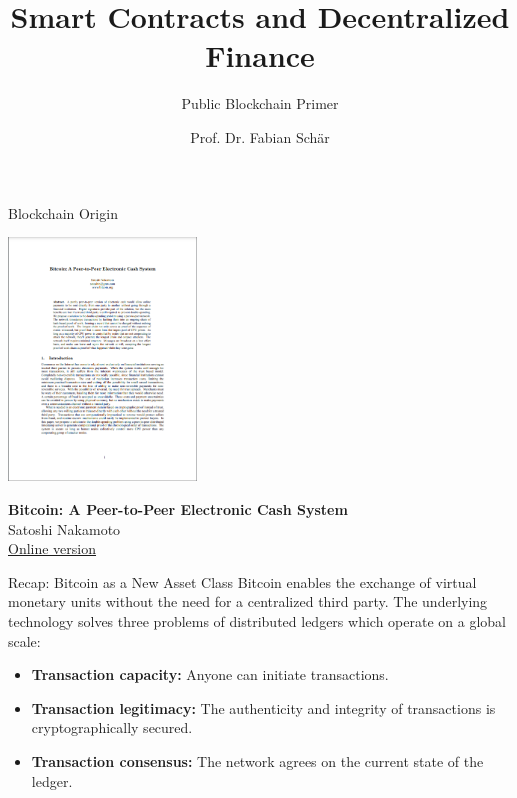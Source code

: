 \documentclass[]{beamer}
\title{Smart Contracts and Decentralized Finance}
\subtitle{Public Blockchain Primer}
\author{Prof. Dr. Fabian Schär}
\institute{University of Basel}
\begin{document}
\thispagestyle{empty}
\begin{frame}[noframenumbering]
	\titlepage
\end{frame}

\begin{frame}{Blockchain Origin}

\centering
\includegraphics[width = 5cm, frame]{../assets/images/nakamoto_cover}
		
\textbf{Bitcoin: A Peer-to-Peer Electronic Cash System} \\ 
Satoshi Nakamoto \\
\href{https://bitcoin.org/bitcoin.pdf}{\link Online version}

\end{frame}

\begin{frame}{Recap: Bitcoin as a New Asset Class}
Bitcoin enables the exchange of virtual monetary units \textcolor{focus}{without the need for a centralized third party}. The underlying technology solves three problems of distributed ledgers which operate on a global scale:

\begin{itemize}
\item<2-> \textbf{Transaction capacity:} Anyone can initiate transactions.
\item<3-> \textbf{Transaction legitimacy:} The authenticity and integrity of transactions is cryptographically secured.
\item<4-> \textbf{Transaction consensus:} The network agrees on the current state of the ledger.

\end{itemize}

\end{frame}
\end{document}
